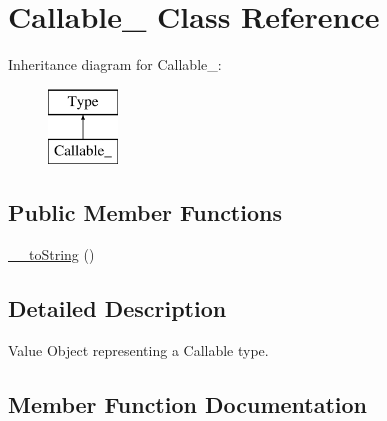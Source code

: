 \hypertarget{classphp_documentor_1_1_reflection_1_1_types_1_1_callable__}{}\section{Callable\+\_\+ Class Reference}
\label{classphp_documentor_1_1_reflection_1_1_types_1_1_callable__}
Inheritance diagram for Callable\+\_\+\+:\begin{figure}[H]
\begin{center}
\leavevmode
\includegraphics[height=2.000000cm]{classphp_documentor_1_1_reflection_1_1_types_1_1_callable__}
\end{center}
\end{figure}
\subsection*{Public Member Functions}
\begin{DoxyCompactItemize}
\item 
\mbox{\hyperlink{classphp_documentor_1_1_reflection_1_1_types_1_1_callable___a7516ca30af0db3cdbf9a7739b48ce91d}{\+\_\+\+\_\+to\+String}} ()
\end{DoxyCompactItemize}


\subsection{Detailed Description}
Value Object representing a Callable type. 

\subsection{Member Function Documentation}
\mbox{\label{classphp_documentor_1_1_reflection_1_1_types_1_1_callable___a7516ca30af0db3cdbf9a7739b48ce91d}} 
